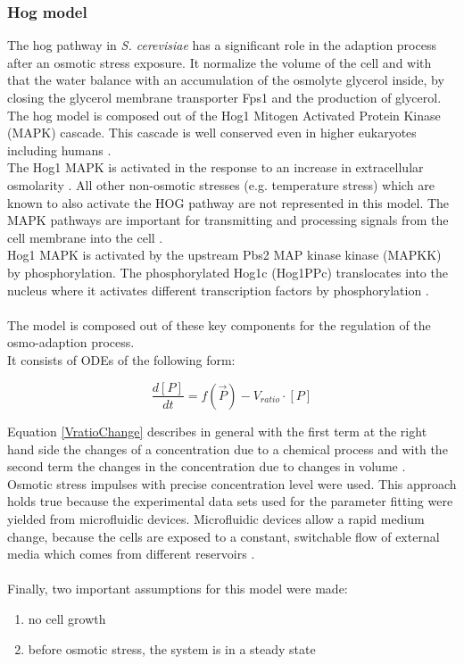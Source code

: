 \subsubsection{Hog model}
The hog pathway in \emph{S. cerevisiae} has a significant role in the adaption process after an osmotic stress exposure. It normalize the volume of the cell and with that the water balance with an accumulation of the osmolyte glycerol inside, by closing the glycerol membrane transporter Fps1 \cite{Saito2012} \cite{ASimpleMathematicalModel} and the production of glycerol.  \\
The hog model is composed out of the Hog1 Mitogen Activated Protein Kinase (MAPK) cascade. This cascade is well conserved even in higher eukaryotes including humans \cite{ASimpleMathematicalModel}. \\ 
The Hog1 MAPK is activated in the response to an increase in extracellular osmolarity \cite{Saito2012}. All other non-osmotic stresses (e.g. temperature stress) which are known to also activate the HOG pathway \cite{Saito2012} are not represented in this model. The MAPK pathways are important for transmitting and processing signals from the cell membrane into the cell \cite{ASimpleMathematicalModel}. \\
Hog1 MAPK is activated by the upstream Pbs2 MAP kinase kinase (MAPKK) by phosphorylation. The phosphorylated Hog1c (Hog1PPc) translocates into the nucleus where it activates different transcription factors by phosphorylation \cite{JannisUhlendorf} \cite{Zi_2010}.\\\\
The model is composed out of these key components for the regulation of the osmo-adaption process.\\
It consists of ODEs of the following form:

\begin{equation}\label{VratioChange}
\frac{d[P]}{dt} = f(\vec{P})-V_{ratio}\cdot [P]
\end{equation}

Equation \ref{VratioChange} describes in general  with the first term at the right hand side the changes of a concentration due to a chemical process and with the second term the changes in the concentration due to changes in volume \cite{Ke_2013}.\\
Osmotic stress impulses with precise concentration level were used. This approach holds true because the experimental data sets used for the parameter fitting were yielded from microfluidic devices. Microfluidic devices allow a rapid medium change, because the cells are exposed to a constant, switchable flow of external media which comes from different reservoirs \cite{Zi_2010}. \\\\
Finally, two important assumptions for this model were made:
\begin{enumerate}
	\item no cell growth
	\item before osmotic stress, the system is in a steady state
\end{enumerate}


\newpage
